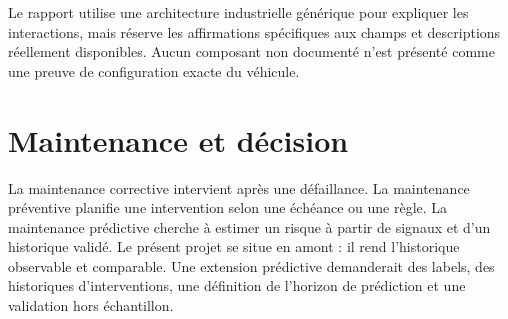 \begin{precaution}
Le rapport utilise une architecture industrielle générique pour expliquer les interactions, mais réserve les affirmations spécifiques aux champs et descriptions réellement disponibles. Aucun composant non documenté n'est présenté comme une preuve de configuration exacte du véhicule.
\end{precaution}

\section{Maintenance et décision}
La maintenance corrective intervient après une défaillance. La maintenance préventive planifie une intervention selon une échéance ou une règle. La maintenance prédictive cherche à estimer un risque à partir de signaux et d'un historique validé. Le présent projet se situe en amont : il rend l'historique observable et comparable. Une extension prédictive demanderait des labels, des historiques d'interventions, une définition de l'horizon de prédiction et une validation hors échantillon.
